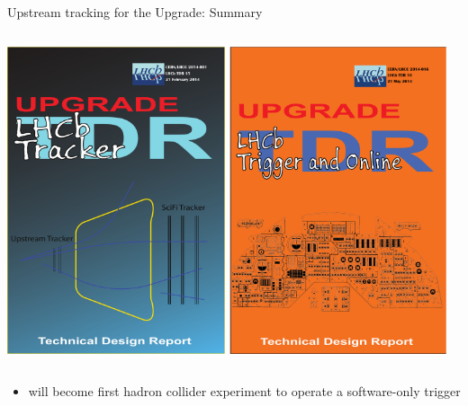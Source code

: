 \documentclass[aspectratio=1610]{beamer}
\begin{document}
\begin{frame}{Upstream tracking for the Upgrade: Summary}
\begin{columns}
\begin{column}{0.25\textwidth}
\href{https://cds.cern.ch/record/1647400}{\includegraphics[width=0.48\textwidth]{figs/Tracking.pdf}}
\href{https://cds.cern.ch/record/1701361}{\includegraphics[width=0.48\textwidth]{figs/Trigger.pdf}}
\end{column}
\end{columns}

\bigskip\bigskip

\begin{itemize}
\item[\ding{80}] \lhcb will become first hadron collider experiment to operate a software-only trigger
\end{itemize}

\end{frame}
\end{document}
